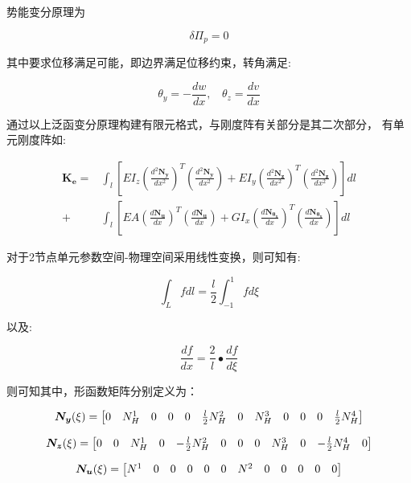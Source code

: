 \documentclass[UTF8,c5size]{ctexart}
\begin{document}
势能变分原理为

$$
\delta\Pi_p=0
$$

其中要求位移满足可能，即边界满足位移约束，转角满足:

\begin{equation}
    \theta_y=-\frac{dw}{dx},\ \ \ \ \theta_z=\frac{dv}{dx}
\end{equation}

通过以上泛函变分原理构建有限元格式，与刚度阵有关部分是其二次部分，
有单元刚度阵如:

\begin{equation}
    \begin{split}
    \bm{K_e} = &\int_{l}{\left[
        EI_z\left(\frac{d^2\bm{N_y}}{dx^2}\right)^T
        \left(\frac{d^2\bm{N_y}}{dx^2}\right)+
        EI_y\left(\frac{d^2\bm{N_z}}{dx^2}\right)^T
        \left(\frac{d^2\bm{N_z}}{dx^2}\right)
        \right]dl}\\+
    &\int_{l}{\left[
        EA\left(\frac{d\bm{N_{u}}}{dx}\right)^T
        \left(\frac{d\bm{N_{u}}}{dx}\right)+
        GI_x\left(\frac{d\bm{N_{\theta_x}}}{dx}\right)^T
        \left(\frac{d\bm{N_{\theta_x}}}{dx}\right)
    \right]dl}
    \end{split}
\end{equation}

对于2节点单元参数空间-物理空间采用线性变换，则可知有:


$$
\int_{L}{fdl}=\frac{l}{2}\int_{-1}^{1}{fd\xi}
$$


以及:

$$
\frac{df}{dx} = \frac{2}{l}\bullet\frac{df}{d\xi}
$$

则可知其中，形函数矩阵分别定义为：

\begin{equation}
    \bm{N_y}(\xi) = 
    \addtocounter{MaxMatrixCols}{40}
    \begin{bmatrix}
        0&N^1_H&0&0&0&\frac{l}{2}N^2_H&0&N^3_H&0&0&0&\frac{l}{2}N^4_H
    \end{bmatrix}
\end{equation}

\begin{equation}
    \bm{N_z}(\xi) = 
    \addtocounter{MaxMatrixCols}{40}
    \begin{bmatrix}
        0&0&N^1_H&0&-\frac{l}{2}N^2_H&0&0&0&N^3_H&0&-\frac{l}{2}N^4_H&0
    \end{bmatrix}
\end{equation}

\begin{equation}
    \bm{N_{u}}(\xi) = 
    \addtocounter{MaxMatrixCols}{40}
    \begin{bmatrix}
        N^1&0&0&0&0&0&N^2&0&0&0&0&0
    \end{bmatrix}
\end{equation}
\end{document}
